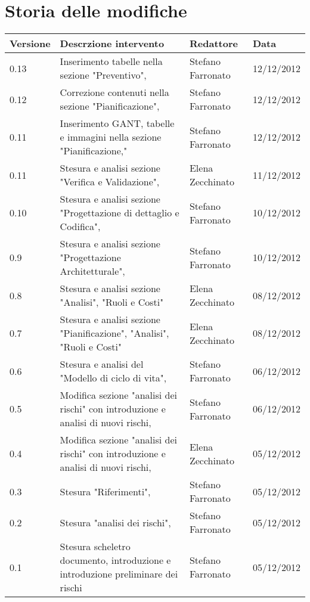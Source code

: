 \section*{Storia delle modifiche}
\begin{tabularx}{\textwidth}{lXll}
\toprule
Versione & Descrzione intervento & Redattore & Data\\
\midrule %
0.13 &Inserimento tabelle nella sezione "Preventivo", & Stefano Farronato & 12/12/2012\\
0.12 &Correzione contenuti nella sezione "Pianificazione", & Stefano Farronato & 12/12/2012\\
0.11 &Inserimento GANT, tabelle e immagini nella sezione "Pianificazione," & Stefano Farronato & 12/12/2012\\
0.11 &Stesura e analisi sezione "Verifica e Validazione", & Elena Zecchinato & 11/12/2012\\
0.10 &Stesura e analisi sezione "Progettazione di dettaglio e Codifica", & Stefano Farronato & 10/12/2012\\
0.9 &Stesura e analisi sezione "Progettazione Architetturale", & Stefano Farronato & 10/12/2012\\
0.8 &Stesura e analisi sezione "Analisi", "Ruoli e Costi" & Elena Zecchinato & 08/12/2012\\
0.7 &Stesura e analisi sezione "Pianificazione", "Analisi", "Ruoli e Costi" & Elena Zecchinato & 08/12/2012\\
0.6 &Stesura e analisi del "Modello di ciclo di vita", & Stefano Farronato & 06/12/2012\\
0.5 &Modifica sezione "analisi dei rischi" con introduzione e analisi di nuovi rischi, & Stefano Farronato & 06/12/2012\\
0.4 & Modifica sezione "analisi dei rischi" con introduzione e analisi di nuovi rischi, & Elena Zecchinato & 05/12/2012\\
0.3 & Stesura "Riferimenti", & Stefano Farronato & 05/12/2012\\
0.2 & Stesura "analisi dei rischi", & Stefano Farronato & 05/12/2012\\
0.1 & Stesura scheletro documento, introduzione e introduzione preliminare dei rischi & Stefano Farronato & 05/12/2012\\
\bottomrule
\end{tabularx}
\newpage



\setcounter{page}{1}
\pagestyle{normal}


